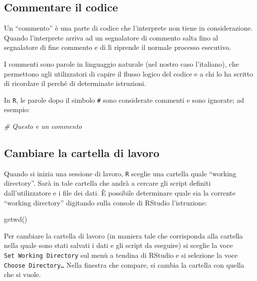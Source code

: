 \documentclass[
  11pt,
]{krantz}
\makeatletter
\newenvironment{Shaded}{\begin{snugshade}}{\end{snugshade}}
\newcommand{\CommentTok}[1]{\textcolor[rgb]{0.37,0.37,0.37}{\textit{#1}}}
\newcommand{\FunctionTok}[1]{\textcolor[rgb]{0,0,0}{#1}}
\newcommand{\NormalTok}[1]{#1}
\newenvironment{kframe}{%
\medskip{}
\setlength{\fboxsep}{.8em}
 \def\at@end@of@kframe{}%
 \ifinner\ifhmode%
  \def\at@end@of@kframe{\end{minipage}}%
  \begin{minipage}{\columnwidth}%
 \fi\fi%
 \def\FrameCommand##1{\hskip\@totalleftmargin \hskip-\fboxsep
 \colorbox{shadecolor}{##1}\hskip-\fboxsep
     \hskip-\linewidth \hskip-\@totalleftmargin \hskip\columnwidth}%
 \MakeFramed {\advance\hsize-\width
   \@totalleftmargin\z@ \linewidth\hsize
   \@setminipage}}%
 {\par\unskip\endMakeFramed%
 \at@end@of@kframe}
\renewenvironment{Shaded}{\begin{kframe}}{\end{kframe}}
\theoremstyle{definition}
\theoremstyle{definition}
\theoremstyle{definition}
\theoremstyle{definition}
\theoremstyle{remark}
\makeatother
\begin{document}
\hypertarget{commentare-il-codice}{%
\subsection{Commentare il codice}\label{commentare-il-codice}}

Un ``commento'' è una parte di codice che l'interprete non tiene in considerazione. Quando l'interprete arriva ad un segnalatore di commento salta fino al segnalatore di fine commento e di lì riprende il normale processo esecutivo.

I commenti sono parole in linguaggio naturale (nel nostro caso l'italiano), che permettono agli utilizzatori di capire il flusso logico del codice e a chi lo ha scritto di ricordare il perché di determinate istruzioni.

In \texttt{R}, le parole dopo il simbolo \texttt{\#} sono considerate commenti e sono ignorate; ad esempio:

\begin{Shaded}
\begin{Highlighting}[]
\CommentTok{\# Questo e\textquotesingle{} un commento}
\end{Highlighting}
\end{Shaded}

\hypertarget{cambiare-la-cartella-di-lavoro}{%
\subsection{Cambiare la cartella di lavoro}\label{cambiare-la-cartella-di-lavoro}}

Quando si inizia una sessione di lavoro, \texttt{R} sceglie una cartella quale ``working directory''. Sarà in tale cartella che andrà a cercare gli script definiti dall'utilizzatore e i file dei dati. È possibile determinare quale sia la corrente ``working directory'' digitando sulla console di RStudio l'istruzione:

\begin{Shaded}
\begin{Highlighting}[]
\FunctionTok{getwd}\NormalTok{()}
\end{Highlighting}
\end{Shaded}

Per cambiare la cartella di lavoro (in maniera tale che corrisponda alla cartella nella quale sono stati salvati i dati e gli script da eseguire) si sceglie la voce \texttt{Set\ Working\ Directory} sul menù a tendina di RStudio e si selezione la voce \texttt{Choose\ Directory…} Nella finestra che compare, si cambia la cartella con quella che si vuole.
\end{document}
